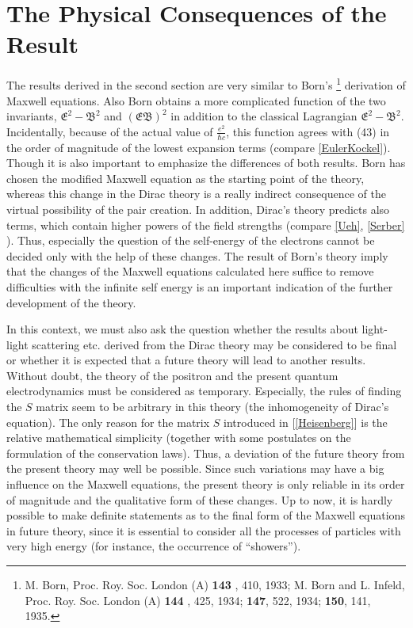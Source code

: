 \documentclass{article}
\begin{document}
\section{The Physical Consequences of the Result}
The results derived in the second section are very similar to Born's%
\footnote{M. Born, Proc. Roy. Soc. London (A) {\bfseries 143 }, 410, 1933;
M. Born and L. Infeld, Proc. Roy. Soc. London (A) {\bfseries 144 }, 425, 1934; {\bfseries 147}, 522, 1934;
{\bfseries 150}, 141, 1935.}
derivation of Maxwell equations.
Also Born obtains a more complicated function of the two invariants, $\mathfrak{E} ^2 -\mathfrak{B}^2 $
and $(\mathfrak{EB}) ^2$ in addition to the classical Lagrangian $\mathfrak{E} ^2 -\mathfrak{B}^2 $.
Incidentally, because of the actual value of $\frac{e ^2}{\hbar c} $, this function agrees with (43) in the order of
magnitude of the lowest expansion terms (compare \ref{EulerKockel}). Though it is also important to emphasize
the differences of both results. Born has chosen the modified Maxwell equation as the starting point of the theory,
whereas this change in the Dirac theory is a really indirect consequence of the virtual possibility of the pair
creation. In addition, Dirac's theory predicts also terms, which contain higher powers of the field strengths (compare
\ref{Ueh}, \ref{Serber} ).
Thus, especially the question of the self-energy of the electrons cannot be decided only with the help
of these changes. The result of Born's theory imply that the changes of the Maxwell equations calculated here
suffice to remove difficulties with the infinite self energy is an important indication of the further
development of the theory.

In this context, we must also ask the question whether the results about light-light scattering etc. derived
from the Dirac theory may be considered to be final or whether it is expected that a future theory will lead to
another results. Without doubt, the theory of the positron and the present quantum electrodynamics must be
considered as temporary. Especially, the rules of finding the $S$ matrix seem to be arbitrary in this theory
(the inhomogeneity of Dirac's equation). The only reason for the matrix $S$ introduced in [\ref{Heisenberg}]
is the relative mathematical simplicity (together with some postulates on the formulation of the conservation laws).
Thus, a deviation of the future theory from the present theory may well be possible. Since such variations may have a
big influence on the Maxwell equations, the present theory is only reliable in its order of magnitude
and the qualitative form of these changes. Up to now, it is hardly possible to make definite statements as to
 the final form of the Maxwell equations in future theory, since it is essential to consider all the processes of
particles with very high energy (for instance, the occurrence of ``showers'').



%
\end{document}
